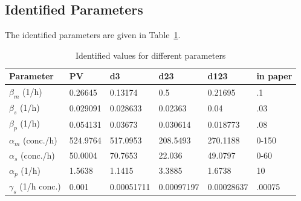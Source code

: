 \documentclass{article}
\begin{document}
\subsection{Identified Parameters}

The identified parameters are given in Table~\ref{paramTable}.

\begin{table}[h!]
\begin{center}
\begin{tabular}{|l|l|l|l|l|l|}
\hline
Parameter & PV & d3 & d23 & d123 & in paper\\\hline
$\beta_m$ (1/h) &0.26645&0.13174&0.5&0.21695 &.1\\\hline
$\beta_s$ (1/h) &0.029091&0.028633&0.02363&0.04 & .03\\\hline
$\beta_p$ (1/h) &0.054131&0.03673&0.030614&0.018773 & .08\\\hline
$\alpha_m$ (conc./h) &524.9764&517.0953&208.5493&270.1188 &0-150\\\hline
$\alpha_s$ (conc./h) &50.0004&70.7653&22.036&49.0797 & 0-60\\\hline
$\alpha_p$ (1/h) &1.5638&1.1415&3.3885&1.6738 & 10\\\hline
$\gamma_s$ (1/h conc.) &0.001&0.00051711&0.00097197&0.00028637 & .00075\\\hline
\end{tabular}
\end{center}
\caption{Identified values for different parameters}
\label{paramTable}
\end{table}
\end{document}
